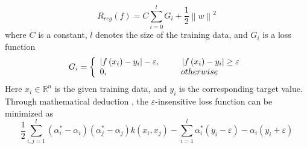 \begin{equation}
{R_{reg}}\left( f \right) = C\sum\limits_{i = 0}^l {{G _i} +
    \frac{1}{2}{{\left\| w \right\|}^2}}
\label{eq:2}
\end{equation}
where $C$ is a constant, $l$ denotes the size of
the training data, and ${G _i}$ is a loss function
\begin{equation}
    {G _i} = \left\{ {\begin{array}{*{20}{l}} {\left| {f\left( {{x_i}} \right)
        - {y_i}} \right| - \varepsilon ,{\kern 1pt} {\kern 1pt} {\kern 1pt}
        {\kern 1pt} {\kern 1pt} {\kern 1pt} {\kern 1pt} {\kern 1pt} {\kern 1pt}
        {\kern 1pt} {\kern 1pt} {\kern 1pt} {\kern 1pt} {\kern 1pt} {\kern 1pt}
        {\kern 1pt} {\kern 1pt} {\kern 1pt} {\kern 1pt} {\kern 1pt} {\kern 1pt}
        {\kern 1pt} {\kern 1pt} {\kern 1pt} \left| {f\left( {{x_i}} \right) -
        {y_i}} \right| \ge \varepsilon }\\ {0,{\kern 1pt} {\kern 1pt} {\kern
        1pt} {\kern 1pt} {\kern 1pt} {\kern 1pt} {\kern 1pt} {\kern 1pt} {\kern
        1pt} {\kern 1pt} {\kern 1pt} {\kern 1pt} {\kern 1pt} {\kern 1pt} {\kern
        1pt} {\kern 1pt} {\kern 1pt} {\kern 1pt} {\kern 1pt} {\kern 1pt} {\kern
        1pt} {\kern 1pt} {\kern 1pt} {\kern 1pt} {\kern 1pt} {\kern 1pt} {\kern
        1pt} {\kern 1pt} {\kern 1pt} {\kern 1pt} {\kern 1pt} {\kern 1pt} {\kern
        1pt} {\kern 1pt} {\kern 1pt} {\kern 1pt} {\kern 1pt} {\kern 1pt} {\kern
        1pt} {\kern 1pt} {\kern 1pt} {\kern 1pt} {\kern 1pt} {\kern 1pt} {\kern
        1pt} {\kern 1pt} {\kern 1pt} {\kern 1pt} {\kern 1pt} {\kern 1pt} {\kern
        1pt} {\kern 1pt} {\kern 1pt} {\kern 1pt} {\kern 1pt} {\kern 1pt} {\kern
        1pt} {\kern 1pt} {\kern 1pt} {\kern 1pt} {\kern 1pt} {\kern 1pt} {\kern
        1pt} {\kern 1pt} {\kern 1pt} {\kern 1pt} {\kern 1pt} {\kern 1pt} {\kern
        1pt} {\kern 1pt} {\kern 1pt} {\kern 1pt} {\kern 1pt} {\kern 1pt} {\kern
        1pt} {\kern 1pt} {\kern 1pt} {\kern 1pt} {\kern 1pt} {\kern 1pt} {\kern
        1pt} {\kern 1pt} {\kern 1pt} {\kern 1pt} {\kern 1pt} {\kern 1pt} {\kern
        1pt} otherwise}
\end{array}} \right.
\end{equation}
Here $x_i\in \mathbb{R}^n$ is the given training data, and
$y_i$ is the corresponding target value. Through mathematical deduction
\cite{travel}, the $\varepsilon$-insensitive loss function can be
minimized as
\begin{equation}
\frac{1}{2}\sum\limits_{i,j = 1}^l {\left( {\alpha _i^* - {\alpha _i}}
    \right)\left( {\alpha _j^* - {\alpha _j}} \right)k\left( {{x_i},{x_j}}
    \right) - \sum\limits_{i = 1}^l {\alpha _i^*\left( {{y_i} - \varepsilon }
    \right)} }  - {\alpha _i}\left( {{y_i} + \varepsilon } \right)
\end{equation}
